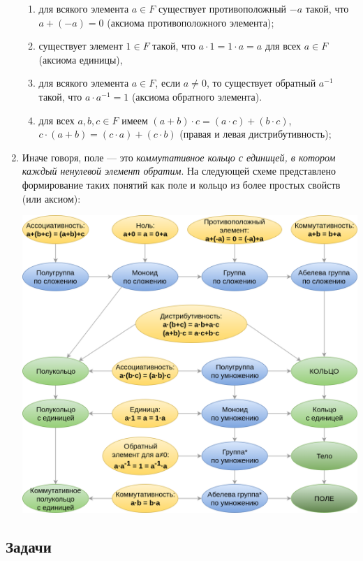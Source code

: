 \begin{enumerate}
\begin{enumerate}[{\bf Field}1]
\item для всякого элемента $a\in F$ существует противоположный $-a$ такой, что $a+(-a)=0$ (аксиома противоположного элемента);
\item существует элемент $1\in F$ такой, что $a\cdot 1=1\cdot a=a$ для всех $a\in F$ (аксиома единицы),
\item для всякого элемента $a\in F$, если $a\ne 0$, то существует обратный $a^{-1}$ такой, что $a\cdot a^{-1}=1$ (аксиома обратного элемента).
\item для всех $a,b,c\in F$ имеем $(a+b)\cdot c=(a\cdot c)+(b\cdot c)$, $c\cdot(a+b)=(c\cdot a)+(c\cdot b)$ (правая и левая дистрибутивность);
\end{enumerate}
\item Иначе говоря, поле --- это \textit{коммутативное кольцо с единицей, в котором каждый ненулевой элемент обратим}. На следующей схеме представлено формирование таких понятий как поле и кольцо из более простых свойств (или аксиом):
\begin{center}
\includegraphics[scale=0.25]{Ring.png}
\end{center}
\end{enumerate}


\subsection*{Задачи}





